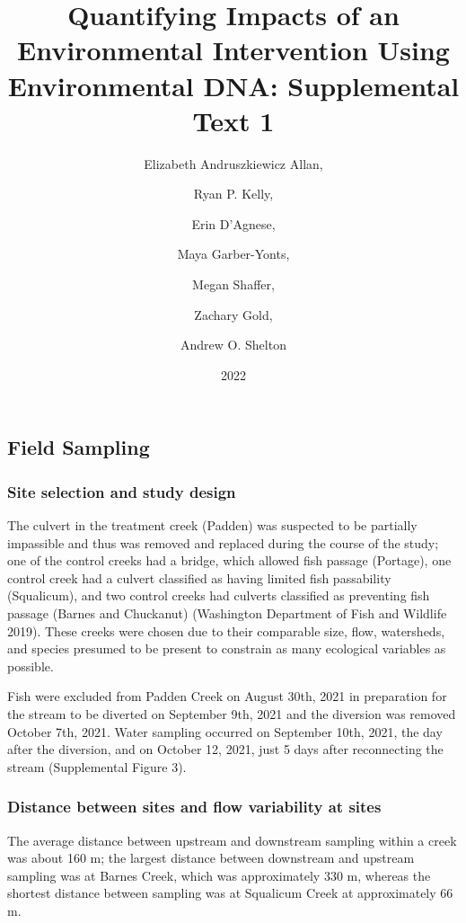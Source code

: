 \documentclass[
]{article}
\title{Quantifying Impacts of an Environmental Intervention Using
Environmental DNA: Supplemental Text 1}
\author{Elizabeth Andruszkiewicz Allan, \and Ryan P. Kelly, \and Erin
D'Agnese, \and Maya Garber-Yonts, \and Megan Shaffer, \and Zachary
Gold, \and Andrew O. Shelton}
\date{2022}
\begin{document}
\maketitle

\hypertarget{field-sampling}{%
\subsection{Field Sampling}\label{field-sampling}}

\hypertarget{site-selection-and-study-design}{%
\subsubsection{Site selection and study
design}\label{site-selection-and-study-design}}

The culvert in the treatment creek (Padden) was suspected to be
partially impassible and thus was removed and replaced during the course
of the study; one of the control creeks had a bridge, which allowed fish
passage (Portage), one control creek had a culvert classified as having
limited fish passability (Squalicum), and two control creeks had
culverts classified as preventing fish passage (Barnes and Chuckanut)
(Washington Department of Fish and Wildlife 2019). These creeks were
chosen due to their comparable size, flow, watersheds, and species
presumed to be present to constrain as many ecological variables as
possible.

Fish were excluded from Padden Creek on August 30th, 2021 in preparation
for the stream to be diverted on September 9th, 2021 and the diversion
was removed October 7th, 2021. Water sampling occurred on September
10th, 2021, the day after the diversion, and on October 12, 2021, just 5
days after reconnecting the stream (Supplemental Figure 3).

\hypertarget{distance-between-sites-and-flow-variability-at-sites}{%
\subsubsection{Distance between sites and flow variability at
sites}\label{distance-between-sites-and-flow-variability-at-sites}}

The average distance between upstream and downstream sampling within a
creek was about 160 m; the largest distance between downstream and
upstream sampling was at Barnes Creek, which was approximately 330 m,
whereas the shortest distance between sampling was at Squalicum Creek at
approximately 66 m.
\end{document}
